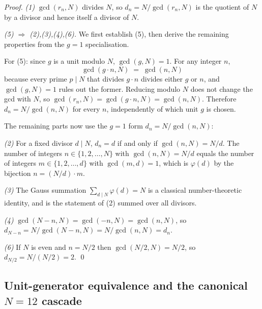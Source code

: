 \documentclass[11pt,a4paper]{article}
\theoremstyle{definition}
\theoremstyle{remark}
\begin{document}
\begin{proof}
\emph{(1)} $\gcd(r_{n},N)$ divides $N$, so $d_{n} = N/\gcd(r_{n},N)$ is the quotient of $N$ by a divisor and hence itself a divisor of $N$.

\emph{(5) $\Rightarrow$ (2),(3),(4),(6).} We first establish (5), then derive the remaining properties from the $g=1$ specialisation.

For (5): since $g$ is a unit modulo $N$, $\gcd(g,N)=1$. For any integer $n$,
\[
\gcd(g\cdot n, N) \;=\; \gcd(n, N)
\]
because every prime $p\mid N$ that divides $g\cdot n$ divides either $g$ or $n$, and $\gcd(g,N)=1$ rules out the former. Reducing modulo $N$ does not change the gcd with $N$, so $\gcd(r_{n},N) = \gcd(g\cdot n, N) = \gcd(n,N)$. Therefore $d_{n} = N/\gcd(n,N)$ for every $n$, independently of which unit $g$ is chosen.

The remaining parts now use the $g=1$ form $d_{n} = N/\gcd(n,N)$:

\emph{(2)} For a fixed divisor $d\mid N$, $d_{n} = d$ if and only if $\gcd(n,N) = N/d$. The number of integers $n \in \{1,2,\ldots,N\}$ with $\gcd(n,N) = N/d$ equals the number of integers $m \in \{1,2,\ldots,d\}$ with $\gcd(m,d) = 1$, which is $\varphi(d)$ by the bijection $n = (N/d)\cdot m$.

\emph{(3)} The Gauss summation $\sum_{d\mid N}\varphi(d) = N$ is a classical number-theoretic identity, and is the statement of \textnormal{(2)} summed over all divisors.

\emph{(4)} $\gcd(N-n,N) = \gcd(-n,N) = \gcd(n,N)$, so $d_{N-n} = N/\gcd(N-n,N) = N/\gcd(n,N) = d_{n}$.

\emph{(6)} If $N$ is even and $n=N/2$ then $\gcd(N/2, N) = N/2$, so $d_{N/2} = N/(N/2) = 2$. \qed
\end{proof}

\subsection{Unit-generator equivalence and the canonical $N=12$ cascade}\label{subsec:unit-equivalence}
\end{document}
